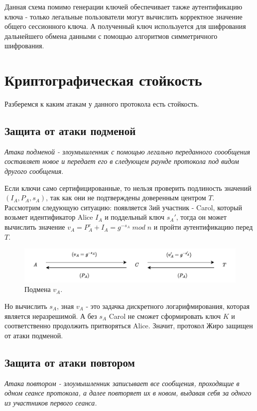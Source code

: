 \documentclass[a4paper]{article}
\begin{document}
Данная схема помимо генерации ключей обеспечивает также аутентификацию ключа - только легальные пользователи могут вычислить корректное значение общего сессионного ключа.
А полученный ключ используется для шифрования дальнейшего обмена данными с помощью алгоритмов симметричного шифрования.

\section{Криптографическая стойкость}
Разберемся к каким атакам у данного протокола есть стойкость.
\subsection{Защита от атаки подменой}
\textit{Атака подменой - злоумышленник с помощью легально переданного соообщения составляет новое и передает его в следующем раунде протокола под видом другого сообщения}.
\\
\par 
Если ключи само сертифицированные, то нельзя проверить подлиность значений $(I_A, P_A, s_A)$, так как они не подтверждены доверенным центром $T$.\\
Рассмотрим следующую ситуацию: появляется 3ий участник - Carol, который возьмет идентификатор Alice $I_A$ и поддельный ключ $s_A'$, тогда он может вычислить значение $v_A = P_A^e + I_A = g^{-s_A} \; mod \; n$  и пройти аутентификацию перед $T$. 

\begin{figure}[H]
	\begin{center}
	\includegraphics[width=0.7\linewidth]{atac.pdf}
	\caption{Подмена $v_A$.} 
    \label{p3}
	\end{center}
\end{figure}
Но вычислить $s_A$, зная $v_A$ -  это задачка дискретного логарифмирования, которая является неразрешимой.
А без $s_A$ Carol не сможет сформировать ключ $K$ и соответственно продолжить притворяться Alice. Значит, протокол Жиро защищен от атаки подменой.
\subsection{Защита от атаки повтором}

\textit{Атака повтором - злоумышленник записывает все сообщения, проходящие в одном сеансе протокола, а далее повторяет их в новом, выдавая себя за одного из участников первого сеанса.}
\\
\end{document}
